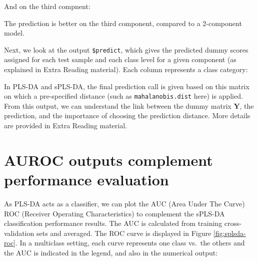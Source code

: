 \documentclass[
]{book}
\newenvironment{Shaded}{\begin{snugshade}}{\end{snugshade}}
\newcommand{\AttributeTok}[1]{\textcolor[rgb]{0.77,0.63,0.00}{#1}}
\newcommand{\CommentTok}[1]{\textcolor[rgb]{0.56,0.35,0.01}{\textit{#1}}}
\newcommand{\DecValTok}[1]{\textcolor[rgb]{0.00,0.00,0.81}{#1}}
\newcommand{\FunctionTok}[1]{\textcolor[rgb]{0.00,0.00,0.00}{#1}}
\newcommand{\NormalTok}[1]{#1}
\newcommand{\OtherTok}[1]{\textcolor[rgb]{0.56,0.35,0.01}{#1}}
\newcommand{\SpecialCharTok}[1]{\textcolor[rgb]{0.00,0.00,0.00}{#1}}
\begin{document}
And on the third compnent:

\begin{Shaded}
\end{Shaded}

The prediction is better on the third component, compared to a 2-component model.

Next, we look at the output \texttt{\$predict}, which gives the predicted dummy scores assigned for each test sample and each class level for a given component (as explained in Extra Reading material). Each column represents a class category:

\begin{Shaded}
\end{Shaded}

In PLS-DA and sPLS-DA, the final prediction call is given based on this matrix on which a pre-specified distance (such as \texttt{mahalanobis.dist} here) is applied. From this output, we can understand the link between the dummy matrix \(\boldsymbol Y\), the prediction, and the importance of choosing the prediction distance. More details are provided in Extra Reading material.

\hypertarget{plsda:auroc}{%
\section{AUROC outputs complement performance evaluation}\label{plsda:auroc}}

As PLS-DA acts as a classifier, we can plot the AUC (Area Under The Curve) ROC (Receiver Operating Characteristics) to complement the sPLS-DA classification performance results. The AUC is calculated from training cross-validation sets and averaged. The ROC curve is displayed in Figure \ref{fig:splsda-roc}. In a multiclass setting, each curve represents one class vs.~the others and the AUC is indicated in the legend, and also in the numerical output:
\end{document}
